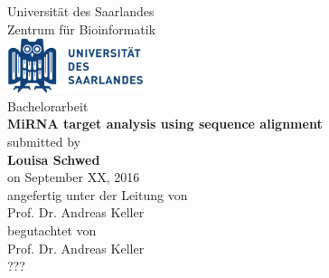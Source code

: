 \documentclass[12pt]{article}
\begin{document}
\def\supervisorIname{Advisor I}
\def\supervisorIIname{Second Reviewer}

	\def\university{Universit\"{a}t des Saarlandes}
	\def\institute{Center for Bioinformatics}
	\def\chair{Bachelor-Studiengang Bioinformatik }
	\def\projectname{MiRNA target analysis using sequence alignment}
	\vspace{.2em}  
	\def\author{Louisa Schwed}
	\def\date{September 2016}

\begin{titlepage}

  \begin{minipage}{\textwidth}
    \begin{center}
    { \large Universität des Saarlandes \\ Zentrum für Bioinformatik\\}
	\vspace{0.5cm}
    \includegraphics[width=4cm]{Logo-Universitaet_des_Saarlandes.pdf}\\
    \vspace{1.5cm}
    { \large Bachelorarbeit\\}
    \vspace{0.5cm}
    {\huge\textbf{\projectname}}\\
    \vspace{1.5cm}
    { \large submitted by}\\
	\vspace{0.5cm}
    {\large\textbf{\author}}\\
    \vspace{0.5cm}
    {\large on September XX, 2016}\\
    \vspace{1.5cm}
    {\large angefertig unter der Leitung von}\\
    \vspace{0.5cm}
    {\large Prof. Dr. Andreas Keller}\\
    \vspace{1.5cm}
    {\large begutachtet von}\\
    \vspace{0.5cm}
    {\large Prof. Dr. Andreas Keller}\\
   	{\large ???}\\
    \vspace{0.5cm}
    \end{center}
  \end{minipage}   
   

\end{titlepage}
\end{document}
